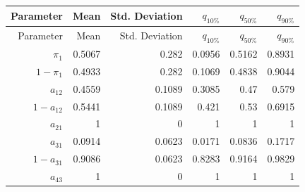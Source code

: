 \documentclass[]{article}
\begin{document}
\begin{longtable}[]{@{}rrrrrr@{}}
\caption{\label{tab:tseg-ins-params}}\tabularnewline
\toprule
Parameter & Mean & Std. Deviation & \(q_{10\%}\) & \(q_{50\%}\) &
\(q_{90\%}\)\tabularnewline
\midrule
\endfirsthead
\toprule
Parameter & Mean & Std. Deviation & \(q_{10\%}\) & \(q_{50\%}\) &
\(q_{90\%}\)\tabularnewline
\midrule
\endhead
\(\pi_{1}\) & 0.5067 & 0.282 & 0.0956 & 0.5162 & 0.8931\tabularnewline
\(1 - \pi_{1}\) & 0.4933 & 0.282 & 0.1069 & 0.4838 &
0.9044\tabularnewline
\(a_{12}\) & 0.4559 & 0.1089 & 0.3085 & 0.47 & 0.579\tabularnewline
\(1 - a_{12}\) & 0.5441 & 0.1089 & 0.421 & 0.53 & 0.6915\tabularnewline
\(a_{21}\) & 1 & 0 & 1 & 1 & 1\tabularnewline
\(a_{31}\) & 0.0914 & 0.0623 & 0.0171 & 0.0836 & 0.1717\tabularnewline
\(1 - a_{31}\) & 0.9086 & 0.0623 & 0.8283 & 0.9164 &
0.9829\tabularnewline
\(a_{43}\) & 1 & 0 & 1 & 1 & 1\tabularnewline
\bottomrule
\end{longtable}
\end{document}
